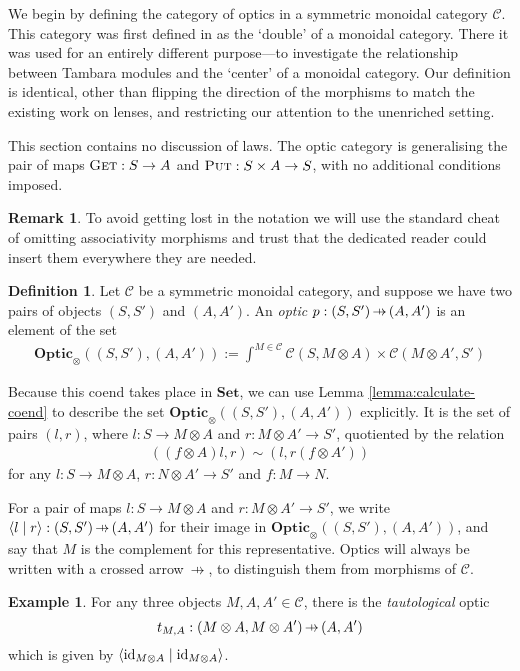\documentclass[11pt,a4paper]{article}
\theoremstyle{plain}
\theoremstyle{definition}
\newtheorem{definition}[theorem]{Definition}
\newtheorem{example}[theorem]{Example}
\newtheorem{remark}[theorem]{Remark}
\newcommand{\C}{\mathscr{C}}
\newcommand{\Set}{\mathbf{Set}}
\newcommand{\Optic}{\mathbf{Optic}}
\newcommand{\id}{\mathrm{id}}
\newcommand{\rep}[2]{{\ensuremath \left\langle #1 \mid #2 \right\rangle}}
\newcommand{\fget}{\textsc{Get}}
\newcommand{\fput}{\textsc{Put}}
\newcommand{\hto}{\ensuremath{\,\mathaccent\shortmid\rightarrow\,}}
\begin{document}
We begin by defining the category of optics in a symmetric monoidal category $\C$. This category was first defined in \cite[Section 6]{Doubles} as the `double' of a monoidal category. There it was used for an entirely different purpose---to investigate the relationship between Tambara modules and the `center' of a monoidal category. Our definition is identical, other than flipping the direction of the morphisms to match the existing work on lenses, and restricting our attention to the unenriched setting.

This section contains no discussion of laws. The optic category is  generalising the pair of maps $\fget : S \to A$ and $\fput : S \times A \to S$, with no additional conditions imposed.

\begin{remark}
  To avoid getting lost in the notation we will use the standard cheat of omitting associativity morphisms and trust that the dedicated reader could insert them everywhere they are needed.
\end{remark}

\begin{definition}
  Let $\C$ be a symmetric monoidal category, and suppose we have two pairs of objects $(S, S')$ and $(A, A')$. An \emph{optic} $p : (S, S') \hto (A, A')$ is an element of the set
  \begin{align*}
    \Optic_\otimes((S, S'), (A, A')) := \int^{M \in \C} \C(S, M \otimes A) \times \C(M \otimes A', S')
  \end{align*}
\end{definition}

Because this coend takes place in $\Set$, we can use Lemma \ref{lemma:calculate-coend} to describe the set $\Optic_\otimes((S, S'), (A, A'))$ explicitly. It is the set of pairs $(l, r)$, where $l : S \to M \otimes A$ and $r : M \otimes A' \to S'$, quotiented by the relation
\begin{align*}
  ((f \otimes A) l, r) \sim (l, r (f \otimes A'))
\end{align*}
for any $l : S \to M \otimes A$, $r : N \otimes A' \to S'$ and $f : M \to N$.

For a pair of maps $l : S \to M \otimes A$ and $r : M \otimes A' \to S'$, we write $\rep{l}{r} : (S, S') \hto (A, A')$ for their image in $\Optic_\otimes((S, S'), (A, A'))$, and say that $M$ is the complement for this representative. Optics will always be written with a crossed arrow $\hto$, to distinguish them from morphisms of $\C$.

\begin{example}
  For any three objects $M, A, A' \in \C$, there is the \emph{tautological} optic \[t_{M,A} : (M \otimes A, M \otimes A') \hto (A, A')\] which is given by $\rep{\id_{M \otimes A}}{\id_{M \otimes A}}$.
\end{example}
\end{document}
